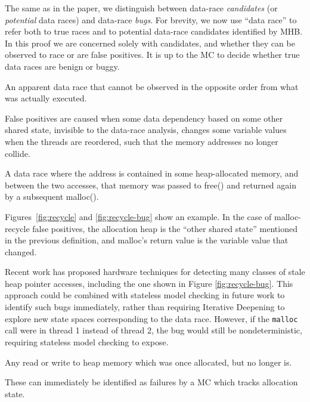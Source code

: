 The same as in the paper, we distinguish between data-race {\em candidates} (or {\em potential} data races) and data-race {\em bugs}.
For brevity, we now use ``data race'' to refer both to true races and to potential data-race candidates identified by MHB.
In this proof we are concerned solely with candidates, and whether they can be observed to race or are false positives.
It is up to the MC to decide whether true data races are benign or buggy.

\begin{definition}
	An apparent data race that cannot be observed in the opposite order from what was actually executed.
\end{definition}

False positives are caused when some data dependency based on some other shared state, invisible to the data-race analysis,
changes some variable values when the threads are reordered, such that the memory addresses no longer collide.

\begin{definition}
	A data race where the address is contained in some heap-allocated memory, and between the two accesses, that memory was passed to free() and returned again by a subsequent malloc().
\end{definition}

Figures~\ref{fig:recycle} and \ref{fig:recycle-bug} show an example.
In the case of malloc-recycle false positives, the allocation heap is the ``other shared state'' mentioned in the previous definition, and malloc's return value is the variable value that changed.

Recent work \cite{sparc-ssm} has proposed hardware techniques for detecting many classes of stale heap pointer accesses, including the one shown in Figure \ref{fig:recycle-bug}.
This approach could be combined with stateless model checking in future work to identify such bugs immediately,
rather than requiring Iterative Deepening to explore new state spaces corresponding to the data race.
However, if the {\tt malloc} call were in thread 1 instead of thread 2, the bug would still be nondeterministic, requiring stateless model checking to expose.

\begin{definition}
	Any read or write to heap memory which was once allocated, but no longer is.
\end{definition}

These can immediately be identified as failures by a MC which tracks allocation state.

